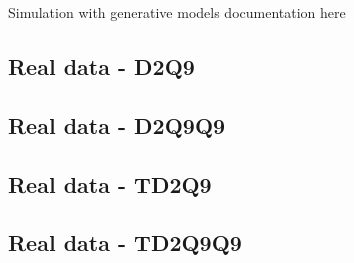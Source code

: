 \documentclass[class=article, crop=false]{standalone}
\begin{document}
Simulation with generative models documentation here

\subsection{Real data - D2Q9}

\subsection{Real data - D2Q9Q9}

\subsection{Real data - TD2Q9}

\subsection{Real data - TD2Q9Q9}
\end{document}
